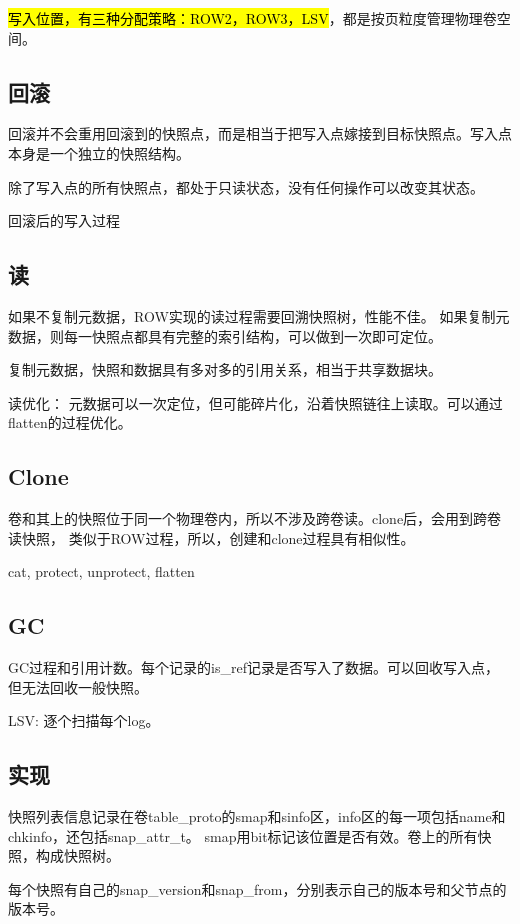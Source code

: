 \hl{写入位置，有三种分配策略：ROW2，ROW3，LSV}，都是按页粒度管理物理卷空间。

\subsection{回滚}

回滚并不会重用回滚到的快照点，而是相当于把写入点嫁接到目标快照点。写入点本身是一个独立的快照结构。

除了写入点的所有快照点，都处于只读状态，没有任何操作可以改变其状态。

回滚后的写入过程

\subsection{读}

如果不复制元数据，ROW实现的读过程需要回溯快照树，性能不佳。
如果复制元数据，则每一快照点都具有完整的索引结构，可以做到一次即可定位。

复制元数据，快照和数据具有多对多的引用关系，相当于共享数据块。

读优化： 元数据可以一次定位，但可能碎片化，沿着快照链往上读取。可以通过flatten的过程优化。

\subsection{Clone}

卷和其上的快照位于同一个物理卷内，所以不涉及跨卷读。clone后，会用到跨卷读快照，
类似于ROW过程，所以，创建和clone过程具有相似性。

cat, protect, unprotect, flatten

\subsection{GC}

GC过程和引用计数。每个记录的is\_ref记录是否写入了数据。可以回收写入点，但无法回收一般快照。

LSV: 逐个扫描每个log。

\subsection{实现}

快照列表信息记录在卷table\_proto的smap和sinfo区，info区的每一项包括name和chkinfo，还包括snap\_attr\_t。
smap用bit标记该位置是否有效。卷上的所有快照，构成快照树。

每个快照有自己的snap\_version和snap\_from，分别表示自己的版本号和父节点的版本号。

